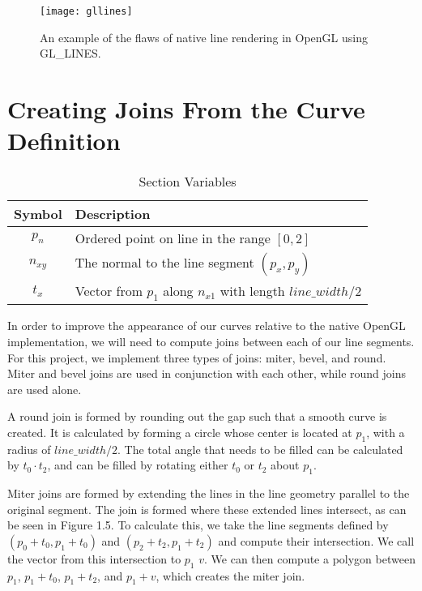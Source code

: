 \begin{figure}
\texttt{[image: gllines]}
\caption{An example of the flaws of native line rendering in OpenGL using GL\_LINES.}
\end{figure}

\pagebreak
\section{Creating Joins From the Curve Definition}

\begin{table}
\begin{center}
\begin{tabular}{|c|l|}
\hline
\textbf{Symbol} & \textbf{Description} \\ \hline
$p_n$			& Ordered point on line in the range $[0,2]$ \\
$n_{xy}$		& The normal to the line segment $(p_x, p_y)$ \\	
$t_x$			& Vector from $p_1$ along $n_{x1}$ with length $line\_width/2$ \\
\hline
\end{tabular}
\caption{Section Variables} \label{tab:linevariables}
\end{center}
\end{table}

In order to improve the appearance of our curves relative to the native OpenGL implementation, we will need to compute joins between each of our line segments.
For this project, we implement three types of joins: miter, bevel, and round.
Miter and bevel joins are used in conjunction with each other, while round joins are used alone.

A round join is formed by rounding out the gap such that a smooth curve is created. 
It is calculated by forming a circle whose center is located at $p_1$, with a radius of $line\_width/2$. 
The total angle that needs to be filled can be calculated by $t_0 \cdot t_2$, and can be filled by rotating either $t_0$ or $t_2$ about $p_1$.

Miter joins are formed by extending the lines in the line geometry parallel to the original segment.
The join is formed where these extended lines intersect, as can be seen in Figure 1.5.
To calculate this, we take the line segments defined by $(p_0 + t_0, p_1 + t_0)$ and $(p_2 + t_2, p_1 + t_2)$ and compute their intersection. We call the vector from this intersection to $p_1$ $v$.
We can then compute a polygon between $p_1$, $p_1 + t_0$, $p_1 + t_2$, and $p_1 + v$, which creates the miter join. 

